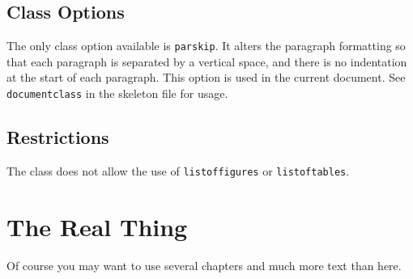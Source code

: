 \documentclass[parskip]{cs4rep}
\begin{document}
\section{Class Options}

The only class option available is {\tt parskip}.
It alters the paragraph formatting so that each paragraph is separated by
a vertical space, and there is no indentation at the start of each
paragraph. 
This option is used in the current document.
See {\tt documentclass} in the skeleton file for usage. 

\section{Restrictions}

The class does not allow the use of {\tt listoffigures} or {\tt listoftables}.

\chapter{The Real Thing}

Of course
you may want to use several chapters and much more text than here.



\end{document}
